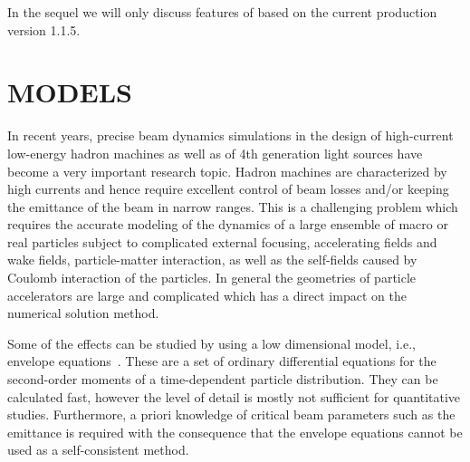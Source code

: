 \documentclass[acus]{JAC2003}
\begin{document}
In the sequel we will only discuss features of \opalt based on the current production version 1.1.5.

\section{MODELS}
In recent years, precise beam dynamics simulations in the design of
high-current low-energy hadron machines as well as of 4th generation
light sources have become a very important research topic.  Hadron
machines are characterized by high currents and hence require excellent
control of beam losses and/or keeping the emittance of the beam in narrow ranges.  This is a challenging
problem which requires the accurate modeling of the dynamics of a large
ensemble of macro or real particles subject to complicated external
focusing, accelerating fields and wake fields, particle-matter interaction, as well as the self-fields
caused by Coulomb interaction of the particles.  In general the
geometries of particle accelerators are large and complicated which has
a direct impact on the numerical solution method.

Some of the effects can be studied by using a low dimensional model,
i.e., envelope equations~\cite{sach:68, sach:71, stru-reis:1984,
  gluckstern1}.  These are a set of ordinary differential equations for
the second-order moments of a time-dependent particle distribution.
They can be calculated fast, however the level of detail is mostly not
sufficient for quantitative studies.  Furthermore, a priori knowledge of
critical beam parameters such as the emittance is required with the consequence that the
envelope equations cannot be used as a self-consistent method.
\end{document}
